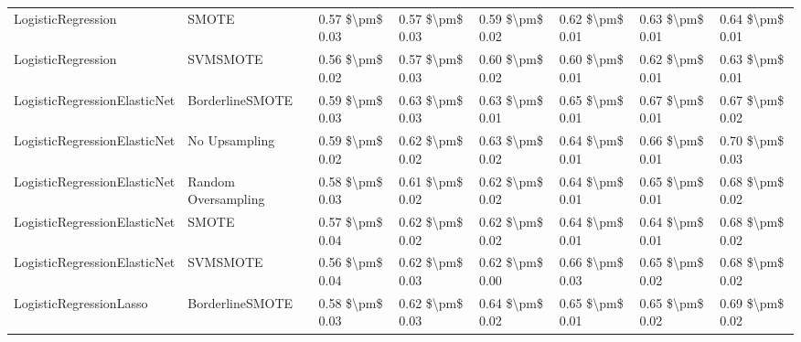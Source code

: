 \begin{tabular}{llllllll}
             LogisticRegression &                         SMOTE &     0.57 \$\textbackslash pm\$ 0.03 &           0.57 \$\textbackslash pm\$ 0.03 &       0.59 \$\textbackslash pm\$ 0.02 &        0.62 \$\textbackslash pm\$ 0.01 &                         0.63 \$\textbackslash pm\$ 0.01 &     0.64 \$\textbackslash pm\$ 0.01 \\
             LogisticRegression &                      SVMSMOTE &     0.56 \$\textbackslash pm\$ 0.02 &           0.57 \$\textbackslash pm\$ 0.03 &       0.60 \$\textbackslash pm\$ 0.02 &        0.60 \$\textbackslash pm\$ 0.01 &                         0.62 \$\textbackslash pm\$ 0.01 &     0.63 \$\textbackslash pm\$ 0.01 \\
   LogisticRegressionElasticNet &               BorderlineSMOTE &     0.59 \$\textbackslash pm\$ 0.03 &           0.63 \$\textbackslash pm\$ 0.03 &       0.63 \$\textbackslash pm\$ 0.01 &        0.65 \$\textbackslash pm\$ 0.01 &                         0.67 \$\textbackslash pm\$ 0.01 &     0.67 \$\textbackslash pm\$ 0.02 \\
   LogisticRegressionElasticNet &                 No Upsampling &     0.59 \$\textbackslash pm\$ 0.02 &           0.62 \$\textbackslash pm\$ 0.02 &       0.63 \$\textbackslash pm\$ 0.02 &        0.64 \$\textbackslash pm\$ 0.01 &                         0.66 \$\textbackslash pm\$ 0.01 &     0.70 \$\textbackslash pm\$ 0.03 \\
   LogisticRegressionElasticNet &           Random Oversampling &     0.58 \$\textbackslash pm\$ 0.03 &           0.61 \$\textbackslash pm\$ 0.02 &       0.62 \$\textbackslash pm\$ 0.02 &        0.64 \$\textbackslash pm\$ 0.01 &                         0.65 \$\textbackslash pm\$ 0.01 &     0.68 \$\textbackslash pm\$ 0.02 \\
   LogisticRegressionElasticNet &                         SMOTE &     0.57 \$\textbackslash pm\$ 0.04 &           0.62 \$\textbackslash pm\$ 0.02 &       0.62 \$\textbackslash pm\$ 0.02 &        0.64 \$\textbackslash pm\$ 0.01 &                         0.64 \$\textbackslash pm\$ 0.01 &     0.68 \$\textbackslash pm\$ 0.02 \\
   LogisticRegressionElasticNet &                      SVMSMOTE &     0.56 \$\textbackslash pm\$ 0.04 &           0.62 \$\textbackslash pm\$ 0.03 &       0.62 \$\textbackslash pm\$ 0.00 &        0.66 \$\textbackslash pm\$ 0.03 &                         0.65 \$\textbackslash pm\$ 0.02 &     0.68 \$\textbackslash pm\$ 0.02 \\
        LogisticRegressionLasso &               BorderlineSMOTE &     0.58 \$\textbackslash pm\$ 0.03 &           0.62 \$\textbackslash pm\$ 0.03 &       0.64 \$\textbackslash pm\$ 0.02 &        0.65 \$\textbackslash pm\$ 0.01 &                         0.65 \$\textbackslash pm\$ 0.02 &     0.69 \$\textbackslash pm\$ 0.02 \\

\end{tabular}

